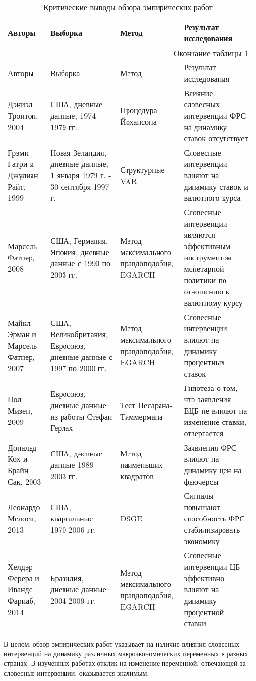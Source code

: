 \begin{longtable}{|m{2.5cm}|m{3.5cm}|m{2.5cm}|m{6cm}|}
	\caption{Критические выводы обзора эмпирических работ}\label{tab1}\\
	\hline
	Авторы & Выборка & Метод & Результат исследования \\ 
	\endfirsthead
	\multicolumn{4}{r}{Окончание таблицы \ref{tab1}}\\\hline
	Авторы & Выборка & Метод & Результат исследования \\ \hline
	\endhead
	\hline
	\endfoot
	\hline
	\endlastfoot
\hline
  		Дэниэл Тронтон, 2004 & США, дневные данные, 1974-1979 гг. & Процедура Йохансона & Влияние словесных интервенции ФРС на динамику ставок отсутствует  \\
  		\hline
  		Грэми Гатри и Джулиан Райт, 1999 & Новая Зеландия, дневные данные, 1 января 1979 г. - 30 сентября 1997 г.& Структурные VAR & Словесные интервенции влияют на динамику ставок и валютного курса  \\ 
  		\hline
  		Марсель Фатнер, 2008 & США, Германия, Япония, дневные данные с 1990 по 2003 гг.  & Метод максимального правдоподобия, EGARCH & Словесные интервенции являются эффективным инструментом монетарной политики по отношению к валютному курсу \\ 
  		\hline
  		Майкл Эрман и Марсель Фатнер, 2007 & США, Великобритания, Евросоюз, дневные данные с 1997 по 2000 гг. & Метод максимального правдоподобия, EGARCH & Словесные интервенции влияют на динамику процентных ставок \\ 
  		\hline
  		Пол Мизен, 2009 & Евросоюз, дневные данные из работы Стефан Герлах & Тест Песарана-Тиммермана & Гипотеза о том, что заявления ЕЦБ не влияют на изменение ставки, отвергается  \\
  		\hline
  		Дональд Кох и Брайн Сак, 2003 & США, дневные данные 1989 - 2003 гг. & Метод наименьших квадратов & Заявления ФРС влияют на динамику цен на фьючерсы  \\
  		\hline
  		Леонардо Мелоси, 2013 & США, квартальные 1970-2006 гг. & DSGE & Сигналы повышают способность ФРС стабилизировать экономику  \\
  		\hline
  		Хелдэр Ферера и Ивандо Фариаб, 2014 & Бразилия, дневные данные 2004-2009 гг. &Метод максимального правдоподобия, EGARCH& Словесные интервенции ЦБ эффективно влияют на динамику процентной ставки \\
  		\hline
\end{longtable}

В целом, обзор эмпирических работ указывает на наличие влияния словесных интервенций на динамику различных макроэкономических переменных в разных  странах. В изученных работах отклик на изменение переменной, отвечающей за словесные интервенции, оказывается значимым. 

